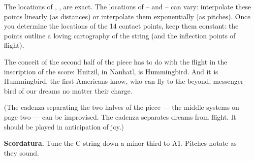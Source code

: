 The locations of 
,
,
are exact.
The locations of
 --
and 
 --
can vary:
interpolate these points linearly (as distances) or interpolate them
exponentially (as pitches). Once you determine the locations of the 14 contact
points, keep them constant: the points outline a loving cartography of the
string (and the inflection points of flight).

The conceit of the second half of the piece has to do with the flight in the
inscription of the score: Huitzil, in Nauhatl, is Hummingbird. And it is
Hummingbird, the first Americans know, who can fly to the beyond,
messenger-bird of our dreams no matter their charge.

(The cadenza separating the two halves of the piece --- the middle systems on
page two --- can be improvised. The cadenza separates dreams from flight. It
should be played in anticipation of joy.)

\textbf{Scordatura.} Tune the C-string down a minor third to A1. Pitches notate
as they sound.
